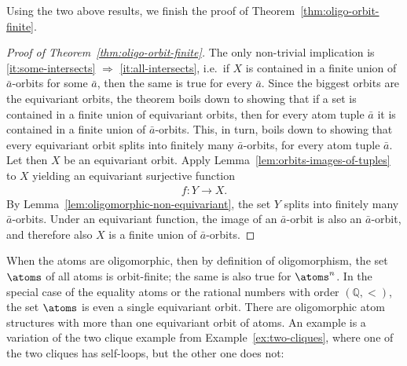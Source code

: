 Using the two above results, we finish the proof of Theorem~\ref{thm:oligo-orbit-finite}.


\begin{proof}[Proof of Theorem~\ref{thm:oligo-orbit-finite}]
   The only non-trivial implication is \ref{it:some-intersects} $\Rightarrow$ \ref{it:all-intersects}, i.e.~if $X$ is contained in a finite union of $\bar a$-orbits for some $\bar a$, then the same is true for every $\bar a$. Since the biggest orbits are the equivariant orbits, the theorem boils down to showing that if a set is contained in a finite union of equivariant orbits, then for every atom tuple $\bar a$ it is contained in a finite union of $\bar a$-orbits. This, in turn, boils down to showing that every equivariant orbit splits into finitely many $\bar a$-orbits, for every atom tuple $\bar a$. Let then $X$ be an equivariant orbit. Apply Lemma~\ref{lem:orbits-images-of-tuples} to $X$ yielding an equivariant surjective function
		\begin{align*}
			f : Y \to X.
		\end{align*}
		By Lemma~\ref{lem:oligomorphic-non-equivariant}, the set $Y$ splits into finitely many $\bar a$-orbits. Under an equivariant function, the image of an $\bar a$-orbit is also an $\bar a$-orbit, and therefore also $X$ is a finite union of $\bar a$-orbits. 
\end{proof} 
\begin{myexample} 
When the atoms are oligomorphic, then by definition of oligomorphism, the set $\atoms$ of all atoms is orbit-finite; the same is also true for $\atoms^n$.
   In the special case of the equality atoms or the rational numbers with order $(\mathbb Q, <)$, the set $\atoms$ is even a single equivariant orbit. There are oligomorphic atom structures with more than one equivariant orbit of atoms. An example is a variation of the two clique example from Example~\ref{ex:two-cliques}, where one of the two cliques has self-loops, but the other one does not:
\end{myexample}



